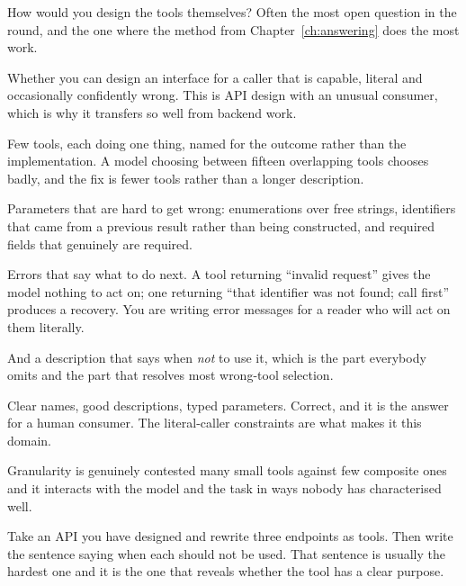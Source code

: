 \begin{bankq}{How would you design the tools themselves?}
\qasked
Often the most open question in the round, and the one where the method from
Chapter~\ref{ch:answering} does the most work.

\qtested
Whether you can design an interface for a caller that is capable, literal and
occasionally confidently wrong. This is API design with an unusual consumer,
which is why it transfers so well from backend work.

\qstaff
Few tools, each doing one thing, named for the outcome rather than the
implementation. A model choosing between fifteen overlapping tools chooses
badly, and the fix is fewer tools rather than a longer description.

Parameters that are hard to get wrong: enumerations over free strings,
identifiers that came from a previous result rather than being constructed, and
required fields that genuinely are required. 

Errors that say what to do next. A tool returning ``invalid request'' gives the
model nothing to act on; one returning ``that identifier was not found; call
 first'' produces a recovery. You are writing error messages
for a reader who will act on them literally.

And a description that says when \emph{not} to use it, which is the part
everybody omits and the part that resolves most wrong-tool selection.

\qsenior
Clear names, good descriptions, typed parameters. Correct, and it is the
answer for a human consumer. The literal-caller constraints are what makes it
this domain.

\qcontested
Granularity is genuinely contested \dash{} many small tools against few
composite ones \dash{} and it interacts with the model and the task in ways
nobody has characterised well. 

\qdrill
Take an API you have designed and rewrite three endpoints as tools. Then write
the sentence saying when each should not be used. That sentence is usually the
hardest one and it is the one that reveals whether the tool has a clear purpose.
\end{bankq}

